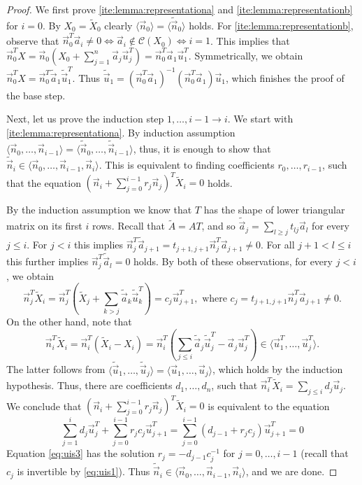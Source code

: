 \documentclass[10pt,a4paper]{amsart}
\newcommand{\Col}[1]{\mathcal{C}(#1)}
\newcommand{\va}{\vec{a}}
\newcommand{\vn}{\vec{n}}
\newcommand{\vu}{\vec{u}}
\begin{document}
\begin{proof}
We first prove \ref{ite:lemma:representationa} and \ref{ite:lemma:representationb} for $i=0$. By $X_0 = \tilde X_0$ clearly $\langle \vn_0 \rangle = \langle \tilde \vn_0 \rangle$ holds. For \ref{ite:lemma:representationb}, observe that $\vn_0^T\va_i \neq 0 \Leftrightarrow \va_i \not\in \Col{X_0} \Leftrightarrow i = 1$. This implies that $\vn_0^TX = \vn_0(X_0 + \sum_{j=1}^n \va_j\vu_j^T) = \vn_0^T\va_1\vu_1^T$. Symmetrically, we obtain $\vn_0^TX =\vn_0^T\tilde \va_1\tilde \vu_1^T$. Thus $\tilde \vu_1 = (\vn_0^T\va_1)^{-1}(\vn_0^T\va_1)\vu_1$, which finishes the proof of the base step.

Next, let us prove the induction step $1,\ldots,i-1\to i$. We start with \ref{ite:lemma:representationa}. By induction assumption $\langle \vn_0,\ldots,\vn_{i-1} \rangle = \langle \tilde \vn_0,\ldots,\tilde \vn_{i-1} \rangle$, thus, it is enough to show that $\tilde \vn_{i} \in \langle \vn_0,\ldots,\vn_{i-1}, \vn_i \rangle$. This is equivalent to finding coefficients $r_0,\ldots,r_{i-1}$, such that the equation $(\vn_i + \sum_{j=0}^{i-1}r_j\vn_j)^T \tilde X_i = 0$ holds.

By the induction assumption we know that $T$ has the shape of lower triangular matrix on its first $i$ rows. Recall that $\tilde A = AT$, and so $\tilde \va_j = \sum_{l\geq j} t_{lj} \va_l$ for every $j\leq i$. For $j < i$ this implies $\vn_j^T \tilde \va_{j+1} = t_{j+1,j+1} \vn_j^T \va_{j+1} \neq 0$. For all $j+1<l\leq i$ this further implies $\vn_j^T \tilde \va_{l} = 0$ holds. By both of these observations, for every $j < i$, we obtain 
\begin{equation} \label{eq:uis1} \vn_j^T \tilde X_i = \vn_j^T (\tilde X_j + \sum_{k>j} \tilde \va_{k}\tilde \vu_k^T) = c_j \vu_{j+1}^T, \text{ where } c_j = t_{j+1,j+1} \vn_j^T \va_{j+1} \neq 0.
\end{equation} On the other hand, note that
\begin{equation} \label{eq:uis2}
\vn_i^T \tilde X_i = \vn_i^T (\tilde X_i - X_i) = \vn_i^T (\sum_{j\leq i} \tilde \va_j \tilde\vu_j^T - \va_j\vu_j^T) \in \langle \vu_1^T, \ldots, \vu_j^T\rangle.
\end{equation}
The latter follows from $\langle \tilde\vu_1, \ldots, \tilde\vu_j\rangle = \langle \vu_1, \ldots, \vu_j\rangle$, which holds by the induction hypothesis. Thus, there are coefficients $d_1,\ldots, d_n$, such that $\vn_i^T \tilde X_i = \sum_{j\leq i} d_j \vu_j$. We conclude that $(\vn_i + \sum_{j=0}^{i-1}r_j \vn_j)^T \tilde X_i = 0$ is equivalent to the equation 
\begin{equation} \label{eq:uis3}
\sum_{j = 1}^i d_j \vu_j^T + \sum_{j=0}^{i-1} r_jc_j \vu_{j+1}^T = \sum_{j=0}^{i-1} (d_{j-1}+r_jc_j) \vu_{j+1}^T= 0 
\end{equation}
Equation \eqref{eq:uis3} has the solution $r_j = -d_{j-1}c_j^{-1}$ for $j=0,\ldots,i-1$ (recall that $c_j$ is invertible by \eqref{eq:uis1}). Thus $\tilde \vn_{i} \in \langle \vn_0,\ldots,\vn_{i-1}, \vn_i \rangle$, and we are done.


\end{proof}
\end{document}
